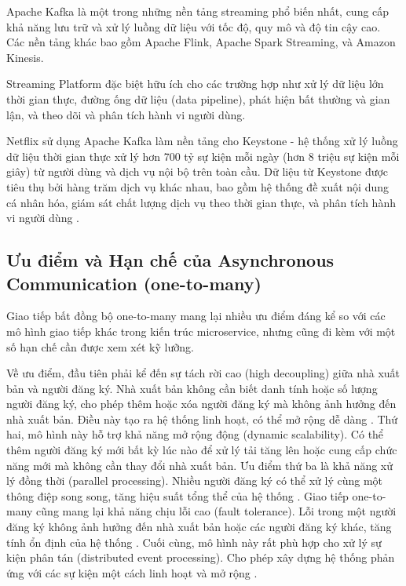 Apache Kafka là một trong những nền tảng streaming phổ biến nhất, cung cấp khả năng lưu trữ và xử lý luồng dữ liệu với tốc độ, quy mô và độ tin cậy cao. Các nền tảng khác bao gồm Apache Flink, Apache Spark Streaming, và Amazon Kinesis.

Streaming Platform đặc biệt hữu ích cho các trường hợp như xử lý dữ liệu lớn thời gian thực, đường ống dữ liệu (data pipeline), phát hiện bất thường và gian lận, và theo dõi và phân tích hành vi người dùng.

Netflix sử dụng Apache Kafka làm nền tảng cho Keystone - hệ thống xử lý luồng dữ liệu thời gian thực xử lý hơn 700 tỷ sự kiện mỗi ngày (hơn 8 triệu sự kiện mỗi giây) từ người dùng và dịch vụ nội bộ trên toàn cầu. Dữ liệu từ Keystone được tiêu thụ bởi hàng trăm dịch vụ khác nhau, bao gồm hệ thống đề xuất nội dung cá nhân hóa, giám sát chất lượng dịch vụ theo thời gian thực, và phân tích hành vi người dùng \cite{idc2021}.

\subsection{Ưu điểm và Hạn chế của Asynchronous Communication (one-to-many)}
Giao tiếp bất đồng bộ one-to-many mang lại nhiều ưu điểm đáng kể so với các mô hình giao tiếp khác trong kiến trúc microservice, nhưng cũng đi kèm với một số hạn chế cần được xem xét kỹ lưỡng.

Về ưu điểm, đầu tiên phải kể đến sự tách rời cao (high decoupling) giữa nhà xuất bản và người đăng ký. Nhà xuất bản không cần biết danh tính hoặc số lượng người đăng ký, cho phép thêm hoặc xóa người đăng ký mà không ảnh hưởng đến nhà xuất bản. Điều này tạo ra hệ thống linh hoạt, có thể mở rộng dễ dàng \cite{newman2015}. Thứ hai, mô hình này hỗ trợ khả năng mở rộng động (dynamic scalability). Có thể thêm người đăng ký mới bất kỳ lúc nào để xử lý tải tăng lên hoặc cung cấp chức năng mới mà không cần thay đổi nhà xuất bản. Ưu điểm thứ ba là khả năng xử lý đồng thời (parallel processing). Nhiều người đăng ký có thể xử lý cùng một thông điệp song song, tăng hiệu suất tổng thể của hệ thống \cite{wolff2016}. Giao tiếp one-to-many cũng mang lại khả năng chịu lỗi cao (fault tolerance). Lỗi trong một người đăng ký không ảnh hưởng đến nhà xuất bản hoặc các người đăng ký khác, tăng tính ổn định của hệ thống \cite{richardson2019}. Cuối cùng, mô hình này rất phù hợp cho xử lý sự kiện phân tán (distributed event processing). Cho phép xây dựng hệ thống phản ứng với các sự kiện một cách linh hoạt và mở rộng \cite{hohpe2004}.

